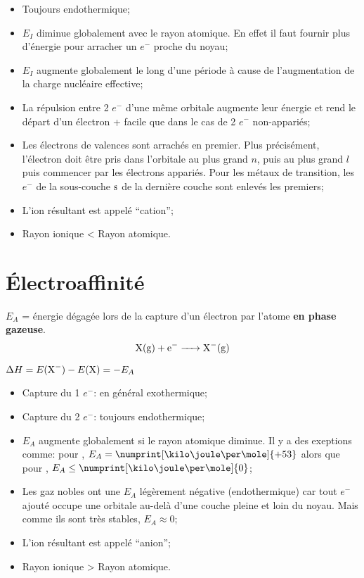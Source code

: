 \begin{itemize}
	\item Toujours endothermique;
	\item $E_I$ diminue globalement avec le rayon atomique.
		En effet il faut fournir plus d'énergie pour arracher un $e^-$ proche du noyau;
	\item $E_I$ augmente globalement le long d'une période à cause de l'augmentation de la charge nucléaire effective;
	\item La répulsion entre 2 $e^-$ d'une même orbitale augmente leur énergie et rend le départ d'un électron + facile que dans le cas de 2 $e^-$ non-appariés;
	\item Les électrons de valences sont arrachés en premier.
		Plus précisément, l'électron doit être pris dans l'orbitale au plus grand $n$, puis au plus grand $l$ puis commencer par les électrons appariés.
		Pour les métaux de transition, les $e^-$ de la sous-couche $\mathrm{s}$ de la dernière couche sont enlevés les premiers;
	\item L'ion résultant est appelé ``cation'';
	\item Rayon ionique < Rayon atomique.
\end{itemize}

\section{\'Electroaffinité}
\label{sec:electro}

$E_A$ = énergie dégagée lors de la capture d'un électron par l'atome \textbf{en phase gazeuse}.
\[ \ce{X(g) + e- -> X^-(g)} \]

$\Delta H = E(\ce{X^-})-E(\ce{X})=-E_A$

\begin{itemize}
	\item Capture du 1 $e^-$: en général exothermique;
	\item Capture du 2 $e^-$: toujours endothermique;
	\item $E_A$ augmente globalement si le rayon atomique diminue.
		Il y a des exeptions comme:
		pour , $E_A = \numprint[\kilo\joule\per\mole]{+53}$ alors que pour , $E_A \leq \numprint[\kilo\joule\per\mole]{0}$;
	\item Les gaz nobles ont une $E_A$ légèrement négative (endothermique) car tout $e^-$ ajouté occupe une orbitale au-delà d'une couche pleine et loin du noyau.
		Mais comme ils sont très stables, $E_A \approx 0$;
	\item L'ion résultant est appelé ``anion'';
	\item Rayon ionique > Rayon atomique.
\end{itemize}

